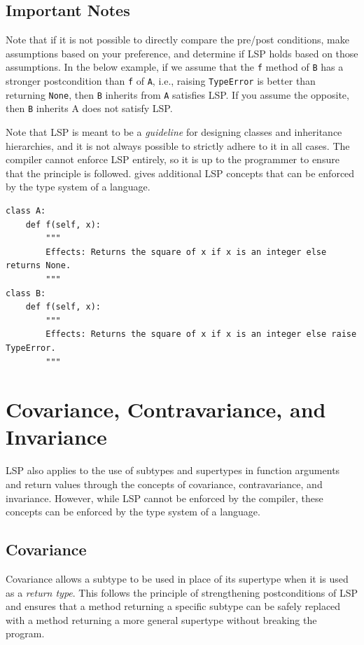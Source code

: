 \documentclass[oneside,11pt,dvipsnames]{book}
\newcommand{\code}[1]{\texttt{#1}}
\begin{document}
\subsection{Important Notes}\label{sec:lsp-notes}

Note that if it is not possible to directly compare the pre/post conditions, make assumptions based on your preference, and determine if LSP holds based on those assumptions. In the below example, if we assume that the \code{f} method of \code{B} has a stronger postcondition than \code{f} of \code{A}, i.e., raising \code{TypeError} is better than returning \code{None}, then \code{B} inherits from \code{A} satisfies LSP. If you assume the opposite, then \code{B} inherits {A} does not satisfy LSP.


Note that LSP is meant to be a \emph{guideline} for designing classes and inheritance hierarchies, and it is not always possible to strictly adhere to it in all cases. The compiler cannot enforce LSP entirely, so it is up to the programmer to ensure that the principle is followed. \label{sec:covariance-contravariance-invariance} gives additional LSP concepts that can be enforced by the type system of a language.

\begin{lstlisting}
class A:
    def f(self, x):
        """
        Effects: Returns the square of x if x is an integer else returns None.
        """
class B:
    def f(self, x):
        """
        Effects: Returns the square of x if x is an integer else raise TypeError.
        """
\end{lstlisting}

\section{Covariance, Contravariance, and Invariance}\label{sec:convariance-contravariance-invariance}

LSP also applies to the use of subtypes and supertypes in function arguments and return values through the concepts of covariance, contravariance, and invariance.  However, while LSP cannot be enforced by the compiler, these concepts can be enforced by the type system of a language.

\subsection{Covariance}
Covariance allows a subtype to be used in place of its supertype when it is used as a \emph{return type}. This follows the principle of strengthening postconditions of LSP and ensures that a method returning a specific subtype can be safely replaced with a method returning a more general supertype without breaking the program.
\end{document}
